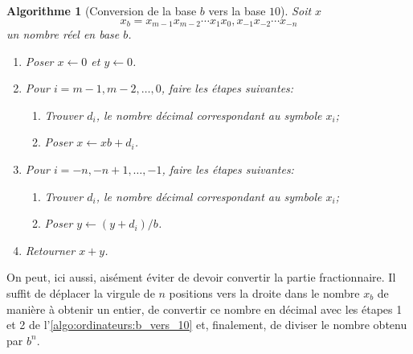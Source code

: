 \documentclass[letterpaper,11pt,english,french]{memoir}
\theoremstyle{plain}
\newtheorem{algorithme}{Algorithme}[chapter]
\theoremstyle{definition}
\theoremstyle{remark}
\begin{document}
\begin{algorithme}[Conversion de la base $b$ vers la base $10$]
  \label{algo:ordinateurs:b_vers_10}
  Soit $x$
  \begin{displaymath}
    x_b = x_{m-1}x_{m-2} \cdots x_1x_0,x_{-1}x_{-2} \cdots x_{-n}
  \end{displaymath}
  un nombre réel en base $b$.
  \begin{enumerate}
  \item Poser $x \leftarrow 0$ et $y \leftarrow 0$.
  \item Pour $i = m - 1, m - 2, \dots, 0$, faire les étapes suivantes:
    \begin{enumerate}
    \item Trouver $d_i$, le nombre décimal correspondant au symbole
      $x_i$;
    \item Poser $x \leftarrow x b + d_i$.
    \end{enumerate}
  \item Pour $i = -n, -n + 1, \dots, -1$, faire les étapes suivantes:
    \begin{enumerate}
    \item Trouver $d_i$, le nombre décimal correspondant au symbole
      $x_i$;
    \item Poser $y \leftarrow (y + d_i)/b$.
    \end{enumerate}
  \item Retourner $x + y$.
  \end{enumerate}
\end{algorithme}

On peut, ici aussi, aisément éviter de devoir convertir la partie
fractionnaire. Il suffit de déplacer la virgule de $n$ positions vers
la droite dans le nombre $x_b$ de manière à obtenir un entier, de
convertir ce nombre en décimal avec les étapes 1 et 2 de
l'\autoref{algo:ordinateurs:b_vers_10} et, finalement, de
diviser le nombre obtenu par $b^n$.
\end{document}
